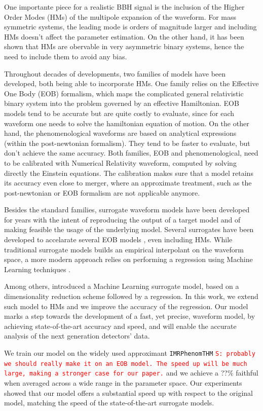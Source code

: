 \documentclass[twocolumn,showpacs,preprintnumbers,nofootinbib,prd,
superscriptaddress,10pt]{revtex4-1}
\newcommand{\stefano}[1]{{\textcolor{red}{\texttt{S: #1}} }}
\begin{document}
One importante piece for a realistic BBH signal is the inclusion of the Higher Order Modes (HMs) of the multipole expansion of the waveform. For mass symmetric systems, the leading mode is orders of magnitude larger and including HMs doesn't affect the parameter estimation. On the other hand, it has been shown \cite{} that HMs are obervable in very asymmetric binary systems, hence the need to include them to avoid any bias.

Throughout decades of developments, two families of models have been developed, both being able to incorporate HMs.
One family relies on the Effective One Body (EOB) formalism, which maps the complicated general relativistic binary system into the problem governed by an effective Hamiltonian. EOB models tend to be accurate but are quite costly to evaluate, since for each waveform one needs to solve the hamiltonian equation of motion.
On the other hand, the phenomenological waveforms are based on analytical expressions (within the post-newtonian formalism). They tend to be faster to evaluate, but don't achieve the same accuracy.
Both families, EOB and phenomenological, need to be calibrated with Numerical Relativity waveform, computed by solving directly the Einstein equations. The calibration makes sure that a model retains its accuracy even close to merger, where an approximate treatment, such as the post-newtonian or EOB formalism are not applicable anymore.

Besides the standard families, surrogate waveform models have been developed for years with the intent of reproducing the output of a target model and of making feasible the usage of the underlying model. Several surrogates have been developed to accelarate several EOB models \cite{}, even including HMs. While traditional surrogate models \cite{} builds an empirical interpolant on the waveform space, a more modern approach relies on performing a regression using Machine Learning techniques \cite{}.

Among others, \cite{Schmidt:2020yuu} introduced a Machine Learning surrogate model, based on a dimensionality reduction scheme followed by a regression. In this work, we extend such model to HMs and we improve the accuracy of the regression. Our model marks a step towards the development of a fast, yet precise, waveform model, by achieving state-of-the-art accuracy and speed, and will enable the accurate analysis of the next generation detectors' data.

We train our model on the widely used approximant \texttt{IMRPhenomTHM} \stefano{probably we should really make it on an EOB model. The speed up will be much large, making a stronger case for our paper.} and we achieve a ??\% faithful when averaged across a wide range in the parameter space.
Our experiments showed that our model offers a substantial speed up with respect to the original model, matching the speed of the state-of-the-art surrogate models.
\end{document}

